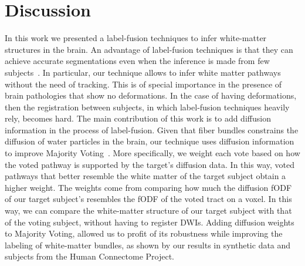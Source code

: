 \section{Discussion}
In this work we presented a label-fusion techniques to infer white-matter
structures in the brain. An advantage of label-fusion techniques is that
they can achieve accurate segmentations even when the inference is
made from few subjects~\cite{Asman2013}. In particular, our technique allows to
infer white matter pathways without the need of tracking. This is of special
importance in the presence of brain pathologies that show no deformations. In the case of having
deformations, then the registration between subjects, in which label-fusion
techniques heavily rely, becomes hard. The main contribution of this work
is to add diffusion information in the process of label-fusion. Given that fiber
bundles constrains the diffusion of
water particles in the brain, our technique uses diffusion information to improve
Majority Voting~\cite{Xu1992}. More specifically, we weight each vote based on how
the voted pathway is supported by the target's diffusion data. In this way, voted
pathways that better resemble the white matter of the target subject obtain a 
higher weight. The weights come from comparing how much the diffusion fODF of our
target subject's resembles the fODF of the voted tract on a voxel. In this way, we
can compare the white-matter structure of our target subject with that of the voting
subject, without having to register DWIs. Adding diffusion weights to Majority Voting,
allowed us to profit of its robustness while improving the labeling of white-matter
bundles, as shown by our results in synthetic data and subjects from the Human
Connectome Project.

